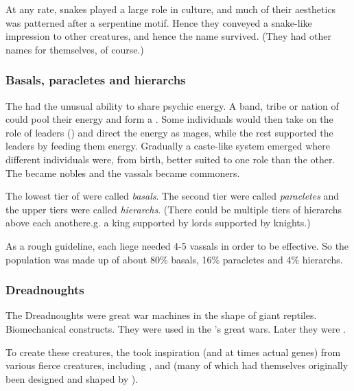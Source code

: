 At any rate, snakes played a large role in \ophidian{} culture, and much of their aesthetics was patterned after a serpentine motif. 
Hence they conveyed a snake-like impression to other creatures, and hence the name \quo{\ophidian} survived. 
(They had other names for themselves, of course.)





\subsubsection{Basals, paracletes and hierarchs}
%
%
%
The \caisith had the unusual ability to share psychic energy. 
A band, tribe or nation of \caisith could pool their energy and form a \nexus. 
Some individuals would then take on the role of leaders (\apexes) and direct the energy as mages, while the rest supported the leaders by feeding them energy. 
Gradually a caste-like system emerged where different individuals were, from birth, better suited to one role than the other. 
The \apexes became nobles and the vassals became commoners. 

The lowest tier of \caisith were called \emph{basals}.
The second tier were called \emph{paracletes} and the upper tiers were called \emph{hierarchs}. 
(There could be multiple tiers of hierarchs above each another\dash e.g. a king supported by lords supported by knights.)

As a rough guideline, each \caisith liege needed 4-5 vassals in order to be effective.
So the population was made up of about 80\% basals, 16\% paracletes and 4\% hierarchs. 





\subsubsection{Dreadnoughts}
The Dreadnoughts were great war machines in the shape of giant reptiles.
Biomechanical constructs. 
They were used in the \caisiths's great wars.
Later they were . 

To create these creatures, the \ophidians{} took inspiration (and at times actual genes) from various fierce creatures, including \nycans, \corgoroth{} and \vreiiden{} (many of which had themselves originally been designed and shaped by \ophidians). 





